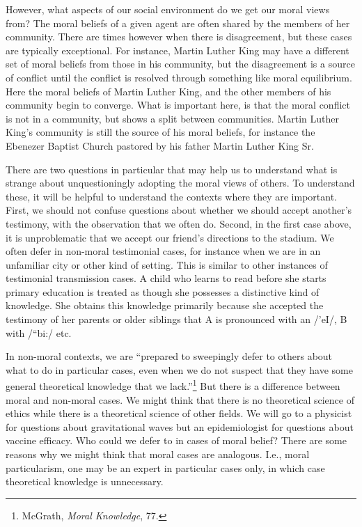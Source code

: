 \documentclass[
  12pt,
]{book}
\theoremstyle{definition}
\theoremstyle{definition}
\theoremstyle{definition}
\theoremstyle{definition}
\theoremstyle{remark}
\begin{document}
However, what aspects of our social environment do we get our moral views from? The moral beliefs of a given agent are often shared by the members of her community. There are times however when there is disagreement, but these cases are typically exceptional. For instance, Martin Luther King may have a different set of moral beliefs from those in his community, but the disagreement is a source of conflict until the conflict is resolved through something like moral equilibrium. Here the moral beliefs of Martin Luther King, and the other members of his community begin to converge. What is important here, is that the moral conflict is not in a community, but shows a split between communities. Martin Luther King's community is still the source of his moral beliefs, for instance the Ebenezer Baptist Church pastored by his father Martin Luther King Sr.

There are two questions in particular that may help us to understand what is strange about unquestioningly adopting the moral views of others. To understand these, it will be helpful to understand the contexts where they are important. First, we should not confuse questions about whether we should accept another's testimony, with the observation that we often do. Second, in the first case above, it is unproblematic that we accept our friend's directions to the stadium. We often defer in non-moral testimonial cases, for instance when we are in an unfamiliar city or other kind of setting. This is similar to other instances of testimonial transmission cases. A child who learns to read before she starts primary education is treated as though she possesses a distinctive kind of knowledge. She obtains this knowledge primarily because she accepted the testimony of her parents or older siblings that A is pronounced with an /'eI/, B with /``bi:/ etc.

In non-moral contexts, we are ``prepared to sweepingly defer to others about what to do in particular cases, even when we do not suspect that they have some general theoretical knowledge that we lack.''\footnote{McGrath, \emph{Moral {Knowledge}}, 77.} But there is a difference between moral and non-moral cases. We might think that there is no theoretical science of ethics while there is a theoretical science of other fields. We will go to a physicist for questions about gravitational waves but an epidemiologist for questions about vaccine efficacy. Who could we defer to in cases of moral belief? There are some reasons why we might think that moral cases are analogous. I.e., moral particularism, one may be an expert in particular cases only, in which case theoretical knowledge is unnecessary.
\end{document}
